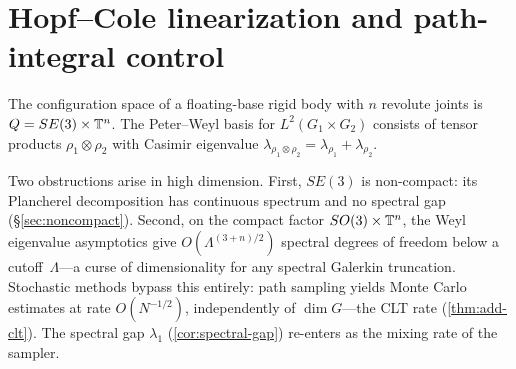 \section{Hopf--Cole linearization and path-integral control}\label{sec:mppi}

\begin{remark}
The configuration space of a floating-base rigid body with $n$ revolute joints is $Q = SE(3) \times \mathbb{T}^n$. The Peter--Weyl basis for $L^2(G_1 \times G_2)$ consists of tensor products $\rho_1 \otimes \rho_2$ with Casimir eigenvalue $\lambda_{\rho_1 \otimes \rho_2} = \lambda_{\rho_1} + \lambda_{\rho_2}$.

Two obstructions arise in high dimension. First, $SE(3)$ is non-compact: its Plancherel decomposition has continuous spectrum and no spectral gap (\S\ref{sec:noncompact}). Second, on the compact factor $SO(3) \times \mathbb{T}^n$, the Weyl eigenvalue asymptotics give $O(\Lambda^{(3+n)/2})$ spectral degrees of freedom below a cutoff~$\Lambda$---a curse of dimensionality for any spectral Galerkin truncation. Stochastic methods bypass this entirely: path sampling yields Monte Carlo estimates at rate $O(N^{-1/2})$, independently of $\dim G$---the CLT rate (\cref{thm:add-clt}). The spectral gap $\lambda_1$ (\cref{cor:spectral-gap}) re-enters as the mixing rate of the sampler.
\end{remark}

